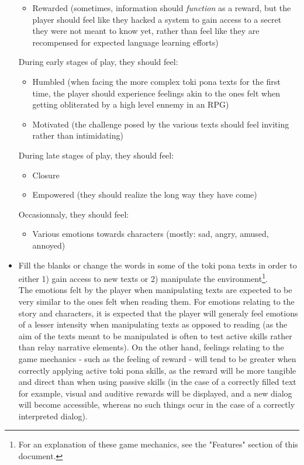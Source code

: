 \documentclass{scrartcl}
\begin{document}
\begin{itemize}
\begin{itemize}
					\item Rewarded (sometimes, information should \textit{function} as a reward, but the player should feel like they hacked a system to gain access to a secret they were not meant to know yet, rather than feel like they are recompensed for expected language learning efforts)
				\end{itemize}
				During early stages of play, they should feel: 
				\begin{itemize}
					\item Humbled (when facing the more complex toki pona texts for the first time, the player should experience feelings akin to the ones felt when getting obliterated by a high level ennemy in an RPG)
					\item Motivated (the challenge posed by the various texts should feel inviting rather than intimidating)
				\end{itemize}
				During late stages of play, they should feel:
				\begin{itemize}
					\item Closure
					\item Empowered (they should realize the long way they have come)
				\end{itemize}
				Occasionnaly, they should feel:
				\begin{itemize}
					\item Various emotions towards characters (mostly: sad, angry, amused, annoyed)
				\end{itemize}
				\item Fill the blanks or change the words in some of the toki pona texts in order to either 1) gain access to new texts or 2) manipulate the environment\footnote{For an explanation of these game mechanics, see the "Features" section of this document.}.\\
				The emotions felt by the player when manipulating texts are expected to be very similar to the ones felt when reading them. For emotions relating to the story and characters, it is expected that the player will generaly feel emotions of a lesser intensity when manipulating texts as opposed to reading (as the aim of the texts meant to be manipulated is often to test active skills rather than relay narrative elements). On the other hand, feelings relating to the game mechanics - such as the feeling of reward - will tend to be greater when correctly applying active toki pona skills, as the reward will be more tangible and direct than when using passive skills (in the case of a correctly filled text for example, visual and auditive rewards will be displayed, and a new dialog will become accessible, whereas no such things ocur in the case of a correctly interpreted dialog).
			\end{itemize}
\end{document}
